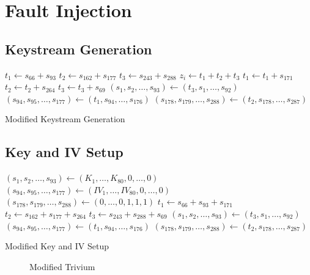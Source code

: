 \documentclass[conference]{IEEEtran}
\begin{document}
\section{Fault Injection}

\subsection{Keystream Generation}

\begin{algorithm}[H]
\begin{algorithmic}[1]
 
\State $t_1 \gets s_{66} + s_{93}$
\State $t_2 \gets s_{162} + s_{177}$
\State $t_3 \gets s_{243} + s_{288}$
\State
\State $z_i \gets t_1 + t_2 + t_3$
\State
\State $t_1 \gets t_1 + s_{171}$
\State $t_2 \gets t_2 + s_{264}$
\State $t_3 \gets t_3 + s_{69}$
\State
\State $(s_1,s_2,\dots,s_{93}) \gets (t_3,s_1,\dots,s_{92})$
\State $(s_{94},s_{95},\dots,s_{177}) \gets (t_1,s_{94},\dots,s_{176})$
\State $(s_{178},s_{179},\dots,s_{288}) \gets (t_2,s_{178},\dots,s_{287})$
\EndFor
\end{algorithmic}
\caption{Modified Keystream Generation}
\end{algorithm}

\subsection{Key and IV Setup}

\begin{algorithm}[H]
\begin{algorithmic}[1]
\State $(s_1,s_2,\dots,s_{93}) \gets (K_1,\dots,K_{80},0,\dots,0)$
\State $(s_{94},s_{95},\dots,s_{177}) \gets (IV_1,\dots,IV_{80},0,\dots,0)$
\State $(s_{178},s_{179},\dots,s_{288}) \gets (0,\dots,0,1,1,1)$
\State
{}
\State $t_1 \gets s_{66} + s_{93} + s_{171}$
\State $t_2 \gets s_{162} + s_{177} + s_{264}$
\State $t_3 \gets s_{243} + s_{288}+ s_{69}$
\State
\State $(s_1,s_2,\dots,s_{93}) \gets (t_3,s_1,\dots,s_{92})$
\State $(s_{94},s_{95},\dots,s_{177}) \gets (t_1,s_{94},\dots,s_{176})$
\State $(s_{178},s_{179},\dots,s_{288}) \gets (t_2,s_{178},\dots,s_{287})$
\EndFor
\end{algorithmic}
\caption{Modified Key and IV Setup}
\end{algorithm}

\begin{figure}
\centering

\caption{Modified Trivium}
\label{fig:modified}
\end{figure}
\end{document}
